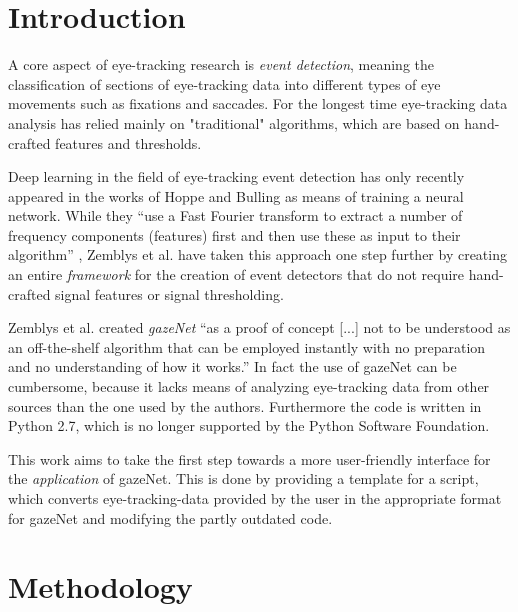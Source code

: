 \documentclass[acmlarge]{acmart}
\begin{document}
\section{Introduction}
A core aspect of eye-tracking research is \emph{event detection}, meaning the classification of sections of eye-tracking data into different types of eye movements such as fixations and saccades. For the longest time eye-tracking data analysis has relied mainly on "traditional" algorithms, which are based on hand-crafted features and thresholds. \cite{zemblys2018gazeNet}

Deep learning in the field of eye-tracking event detection has only recently appeared in the works of Hoppe and Bulling \cite{Hoppe2016EndtoEndEM} as means of training a neural network. While they ``use a Fast Fourier transform to extract a number of frequency components (features) first and then use these as input to their algorithm'' \cite{Hoppe2016EndtoEndEM}, Zemblys et al. \cite{zemblys2018gazeNet} have taken this approach one step further by creating an entire \emph{framework} for the creation of event detectors that do not require hand-crafted signal features or signal thresholding.

Zemblys et al. \cite{zemblys2018gazeNet} created \emph{gazeNet} ``as a proof of concept [...] not to be understood as an off-the-shelf algorithm that can be employed instantly with no preparation and no understanding of how it works.'' \cite{zemblys2018gazeNet} In fact the use of gazeNet can be cumbersome, because it lacks means of analyzing eye-tracking data from other sources than the one used by the authors. Furthermore the code is written in Python 2.7, which is no longer supported by the Python Software Foundation. \cite{van_Rossum_2009}

This work aims to take the first step towards a more user-friendly interface for the \emph{application} of gazeNet. This is done by providing a template for a script, which converts eye-tracking-data provided by the user in the appropriate format for gazeNet and modifying the partly outdated code.


\section{Methodology}
\end{document}
